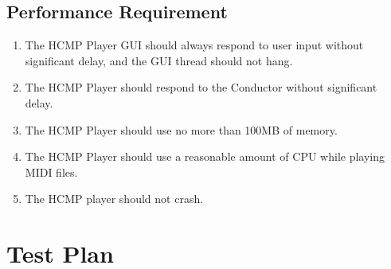 \subsection{Performance Requirement}
\begin{enumerate}
  \item The HCMP Player GUI should always respond to user input without 
        significant delay, and the GUI thread should not hang.
  \item The HCMP Player should respond to the Conductor without significant delay.
  \item The HCMP Player should use no more than 100MB of memory.
  \item The HCMP Player should use a reasonable amount of CPU while playing 
        MIDI files.
  \item The HCMP player should not crash.
\end{enumerate}

\section{Test Plan}
